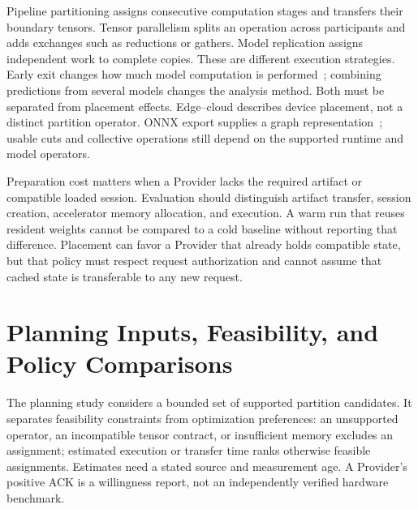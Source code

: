 Pipeline partitioning assigns consecutive computation stages and transfers their boundary tensors. Tensor parallelism splits an operation across participants and adds exchanges such as reductions or gathers. Model replication assigns independent work to complete copies. These are different execution strategies. Early exit changes how much model computation is performed~\cite{branchynet}; combining predictions from several models changes the analysis method. Both must be separated from placement effects. Edge--cloud describes device placement, not a distinct partition operator. ONNX export supplies a graph representation~\cite{onnx}; usable cuts and collective operations still depend on the supported runtime and model operators.

Preparation cost matters when a Provider lacks the required artifact or compatible loaded session. Evaluation should distinguish artifact transfer, session creation, accelerator memory allocation, and execution. A warm run that reuses resident weights cannot be compared to a cold baseline without reporting that difference. Placement can favor a Provider that already holds compatible state, but that policy must respect request authorization and cannot assume that cached state is transferable to any new request.

\section{Planning Inputs, Feasibility, and Policy Comparisons}
The planning study considers a bounded set of supported partition candidates. It separates feasibility constraints from optimization preferences: an unsupported operator, an incompatible tensor contract, or insufficient memory excludes an assignment; estimated execution or transfer time ranks otherwise feasible assignments. Estimates need a stated source and measurement age. A Provider's positive ACK is a willingness report, not an independently verified hardware benchmark.

